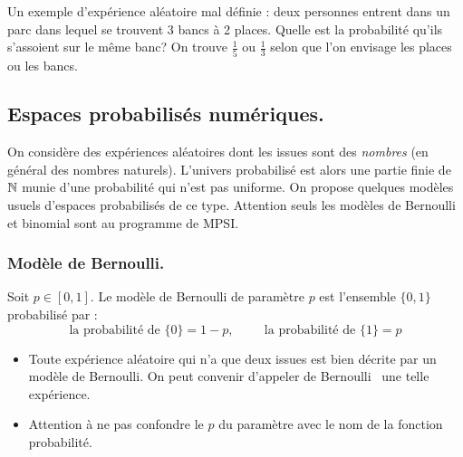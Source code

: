 Un exemple d'expérience aléatoire mal définie : deux personnes entrent dans un parc dans lequel se trouvent  3 bancs à 2 places. Quelle est la probabilité qu'ils s'assoient sur le même banc? On trouve $\frac{1}{5}$ ou $\frac{1}{3}$ selon que l'on envisage les places ou les bancs.


\subsection{Espaces probabilisés numériques.}
On considère des expériences aléatoires dont les issues sont des \emph{nombres} (en général des nombres naturels). L'univers probabilisé est alors une partie finie de $\mathbb{N}$ munie d'une probabilité qui n'est pas uniforme. On propose quelques modèles usuels d'espaces probabilisés de ce type. Attention seuls les modèles de Bernoulli et binomial sont au programme de MPSI. 
\subsubsection{Modèle de Bernoulli.}
\begin{defi}
  Soit $p\in [0,1]$. Le modèle de Bernoulli de paramètre $p$ est l'ensemble $\{0,1\}$ probabilisé par :
  \begin{displaymath}
    \text{la probabilité de } \{0\} = 1-p,\hspace{1cm} \text{la probabilité de } \{1\} = p
  \end{displaymath}
\end{defi}
\begin{rems}
\begin{itemize}
  \item Toute expérience aléatoire qui n'a que deux issues est bien décrite par un modèle de Bernoulli. On peut convenir d'appeler  \og de Bernoulli\fg~ une telle expérience.
  \item Attention à ne pas confondre le $p$ du paramètre avec le nom de la fonction probabilité.
\end{itemize}
\end{rems}

